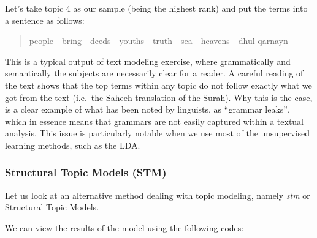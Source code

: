 \documentclass[
]{article}
\newenvironment{Shaded}{\begin{snugshade}}{\end{snugshade}}
\newcommand{\AttributeTok}[1]{\textcolor[rgb]{0.13,0.29,0.53}{#1}}
\newcommand{\DecValTok}[1]{\textcolor[rgb]{0.00,0.00,0.81}{#1}}
\newcommand{\FunctionTok}[1]{\textcolor[rgb]{0.13,0.29,0.53}{\textbf{#1}}}
\newcommand{\NormalTok}[1]{#1}
\newcommand{\OtherTok}[1]{\textcolor[rgb]{0.56,0.35,0.01}{#1}}
\newcommand{\SpecialCharTok}[1]{\textcolor[rgb]{0.81,0.36,0.00}{\textbf{#1}}}
\newcommand{\StringTok}[1]{\textcolor[rgb]{0.31,0.60,0.02}{#1}}
\begin{document}
Let's take topic 4 as our sample (being the highest rank) and put the terms into a sentence as follows:

\begin{quote}
people - bring - deeds - youths - truth - sea - heavens - dhul-qarnayn
\end{quote}

This is a typical output of text modeling exercise, where grammatically and semantically the subjects are necessarily clear for a reader. A careful reading of the text shows that the top terms within any topic do not follow exactly what we got from the text (i.e.~the Saheeh translation of the Surah). Why this is the case, is a clear example of what has been noted by linguists, as ``grammar leaks'', which in essence means that grammars are not easily captured within a textual analysis. This issue is particularly notable when we use most of the unsupervised learning methods, such as the LDA.

\hypertarget{structural-topic-models-stm-1}{%
\subsubsection{Structural Topic Models (STM)}\label{structural-topic-models-stm-1}}

Let us look at an alternative method dealing with topic modeling, namely \emph{stm} or Structural Topic Models.

\footnotesize

\begin{Shaded}
\end{Shaded}

\normalsize

We can view the results of the model using the following codes:
\end{document}
